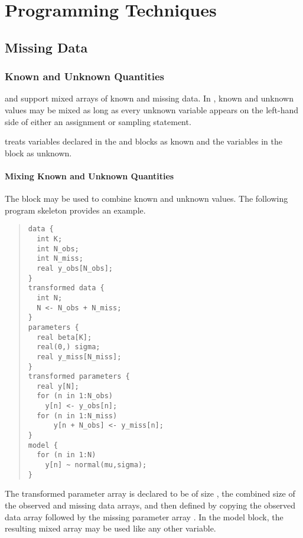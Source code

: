 





\part{Programming Techniques}\label{programming-techniques.part}



\chapter{Missing Data}

\section{Known and Unknown Quantities}

\BUGS and \R support mixed arrays of known and missing data.  In
\BUGS, known and unknown values may be mixed as long as every unknown
variable appears on the left-hand side of either an assignment or
sampling statement.  

\Stan treats variables declared in the  and
 blocks as known and the variables in the
 block as unknown.

\subsection{Mixing Known and Unknown Quantities}

The  block may be used to combine known
and unknown values.  The following program skeleton provides an example.
%
\begin{quote}
\begin{Verbatim}
data {
  int K;   
  int N_obs;               
  int N_miss;
  real y_obs[N_obs];
}
transformed data {
  int N;   
  N <- N_obs + N_miss;
}
parameters {
  real beta[K];
  real(0,) sigma;
  real y_miss[N_miss];
}
transformed parameters {
  real y[N];
  for (n in 1:N_obs)  
    y[n] <- y_obs[n];
  for (n in 1:N_miss) 
      y[n + N_obs] <- y_miss[n];
}
model {
  for (n in 1:N)
    y[n] ~ normal(mu,sigma);
}
\end{Verbatim}
\end{quote}
%
The transformed parameter array  is declared to be of size
, the combined size of the observed and missing data arrays,
and then defined by copying the observed data array 
followed by the missing parameter array .  In the model
block, the resulting mixed array  may be used like any other
variable.

